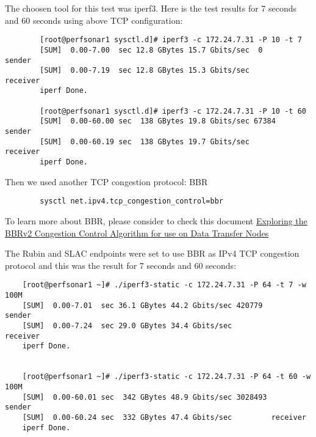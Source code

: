 The choosen tool for this test was iperf3. Here is the test results for 7 seconds and 60 seconds using above TCP configuration:

    \begin{lstlisting}
        [root@perfsonar1 sysctl.d]# iperf3 -c 172.24.7.31 -P 10 -t 7
        [SUM]  0.00-7.00  sec 12.8 GBytes 15.7 Gbits/sec  0      sender
        [SUM]  0.00-7.19  sec 12.8 GBytes 15.3 Gbits/sec         receiver
        iperf Done.

        [root@perfsonar1 sysctl.d]# iperf3 -c 172.24.7.31 -P 10 -t 60
        [SUM]  0.00-60.00 sec  138 GBytes 19.8 Gbits/sec 67384   sender
        [SUM]  0.00-60.19 sec  138 GBytes 19.7 Gbits/sec         receiver
        iperf Done.
    \end{lstlisting}

\newpage

Then we used another TCP congestion protocol: BBR 

    \begin{lstlisting}
        sysctl net.ipv4.tcp_congestion_control=bbr
    \end{lstlisting}

To learn more about BBR, please consider to check this document \href{https://internet2.edu/wp-content/uploads/2022/12/techex22-AdvancedNetworking-ExploringtheBBRv2CongestionControlAlgorithm-Tierney.pdf}{Exploring the BBRv2 Congestion Control
Algorithm for use on Data Transfer Nodes}

The Rubin and SLAC endpoints were set to use BBR as IPv4 TCP congestion protocol and this was the result for 7 seconds and 60 seconds:

    \begin{lstlisting}
    [root@perfsonar1 ~]# ./iperf3-static -c 172.24.7.31 -P 64 -t 7 -w 100M
    [SUM]  0.00-7.01  sec 36.1 GBytes 44.2 Gbits/sec 420779       sender
    [SUM]  0.00-7.24  sec 29.0 GBytes 34.4 Gbits/sec              receiver
    iperf Done.

    
    [root@perfsonar1 ~]# ./iperf3-static -c 172.24.7.31 -P 64 -t 60 -w 100M
    [SUM]  0.00-60.01 sec  342 GBytes 48.9 Gbits/sec 3028493       sender
    [SUM]  0.00-60.24 sec  332 GBytes 47.4 Gbits/sec         receiver
    iperf Done.
    \end{lstlisting}

    